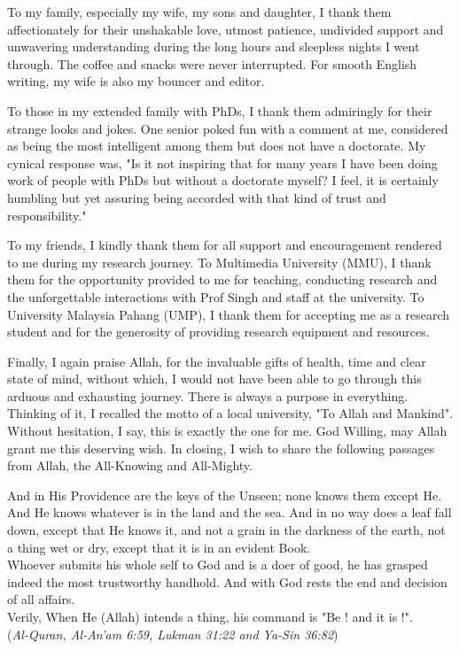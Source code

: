 To my family, especially my wife, my sons and daughter, I thank them affectionately for their unshakable love, utmost patience, undivided support and unwavering understanding during the long hours and sleepless nights I went through. The coffee and snacks were never interrupted. For smooth English writing, my wife is also my bouncer and editor.
\vspace*{1\baselineskip}

To those in my extended family with PhDs, I thank them admiringly for their strange looks and jokes. One senior poked fun with a comment at me, considered as being the most intelligent among them but does not have a doctorate. My cynical response was, "Is it not inspiring that for many years I have been doing work of people with PhDs but without a doctorate myself? I feel, it is certainly humbling but yet assuring being accorded with that kind of trust and responsibility."
\vspace*{1\baselineskip}

To my friends, I kindly thank them for all support and encouragement rendered to me during my research journey. To Multimedia University (MMU), I thank them for the opportunity provided to me for teaching, conducting research and the unforgettable interactions with Prof Singh and staff at the university. To University Malaysia Pahang (UMP), I thank them for accepting me as a research student and for the generosity of providing research equipment and resources.
\vspace*{1\baselineskip}

Finally, I again praise Allah, for the invaluable gifts of health, time and clear state of mind, without which, I would not have been able to go through this arduous and exhausting journey. There is always a purpose in everything. Thinking of it, I recalled the motto of a local university, "To Allah and Mankind". Without hesitation, I say, this is exactly the one for me. God Willing, may Allah grant me this deserving wish. In closing, I wish to share the following passages from Allah, the All-Knowing and All-Mighty. 
\vspace*{1\baselineskip}

\begin{tcolorbox}
\justifying
And in His Providence are the keys of the Unseen; none knows them except He. And He knows whatever is in the land and the sea. And in no way does a leaf fall down, except that He knows it, and not a grain in the darkness of the earth, not a thing wet or dry, except that it is in an evident Book.\\

Whoever submits his whole self to God and is a doer of good, he has grasped indeed the most trustworthy handhold. And with God rests the end and decision of all affairs.\\ 

Verily, When He (Allah) intends a thing, his command is "Be ! and it is !". \\

(\textit{Al-Quran, Al-An'am 6:59, Lukman 31:22 and Ya-Sin 36:82})
\end{tcolorbox}